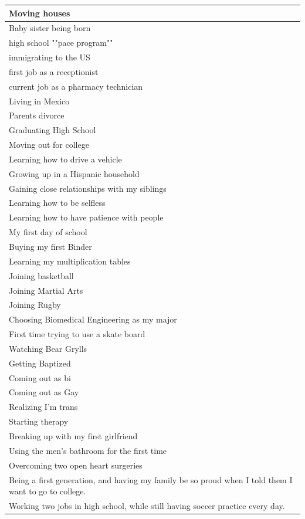 \documentclass[
  .7em,
  letterpaper,
  DIV=11,
  numbers=noendperiod]{scrartcl}
\begin{document}
\begin{table}
\begin{tabular}{l}
\hline
Moving houses\\
\hline
Baby sister being born\\
\hline
high school ""pace program""\\
\hline
immigrating to the US\\
\hline
first job as a receptionist\\
\hline
current job as a pharmacy technician\\
\hline
Living in Mexico\\
\hline
Parents divorce\\
\hline
Graduating High School\\
\hline
Moving out for college\\
\hline
Learning how to drive a vehicle\\
\hline
Growing up in a Hispanic household\\
\hline
Gaining close relationships with my siblings\\
\hline
Learning how to be selfless\\
\hline
Learning how to have patience with people\\
\hline
My first day of school\\
\hline
Buying my first Binder\\
\hline
Learning my multiplication tables\\
\hline
Joining basketball\\
\hline
Joining Martial Arts\\
\hline
Joining Rugby\\
\hline
Choosing Biomedical Engineering as my major\\
\hline
First time trying to use a skate board\\
\hline
Watching Bear Grylls\\
\hline
Getting Baptized\\
\hline
Coming out as bi\\
\hline
Coming out as Gay\\
\hline
Realizing I'm trans\\
\hline
Starting therapy\\
\hline
Breaking up with my first girlfriend\\
\hline
Using the men's bathroom for the first time\\
\hline
Overcoming two open heart surgeries\\
\hline
Being a first generation, and having my family be so proud when I told them I want to go to college.\\
\hline
Working two jobs in high school, while still having soccer practice every day.\\

\end{tabular}
\end{table}
\end{document}
